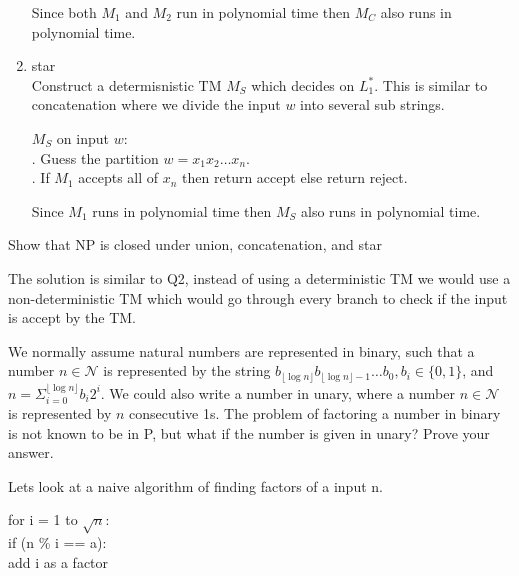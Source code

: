 \documentclass[12pt]{exam}
\begin{document}
\begin{questions}
\begin{solution}
\begin{enumerate}
            Since both $M_{1}$ and $M_{2}$ run in polynomial time then $M_{C}$ also runs in polynomial time.


      \item star\\
            Construct a determisnistic TM $M_{S}$ which decides on $L_{1}^{*}$. This is similar to concatenation where we divide the input $w$ into several sub strings.

            $M_{S}$ on input $w$:\\
            \null {}. Guess the partition $w = x_{1}x_{2}\dots x_{n}$.\\
            \null {}. If $M_{1}$ accepts all of $x_{n}$ then return accept else return reject.

            Since $M_{1}$ runs in polynomial time then $M_{S}$ also runs in polynomial time.

    \end{enumerate}

  \end{solution}

  \question{} %

  Show that NP is closed under union, concatenation, and star

  \begin{solution}
    The solution is similar to Q2, instead of using a deterministic TM we would use a non-deterministic TM which would go through every branch to check if the input is accept by the TM.
  \end{solution}

  \question{} %

  We normally assume natural numbers are represented in binary, such that a number $n\in \mathcal{N}$ is represented by the string $b_{\lfloor\log n \rfloor}b_{\lfloor \log n \rfloor - 1} \dots b_{0}, b_{i} \in \{0,1\}$, and $n=\Sigma^{\lfloor \log n \rfloor}_{i=0}b_{i}2^{i}$.
  We could also write a number in unary, where a number $n\in \mathcal{N}$ is represented by $n$ consecutive 1s.
  The problem of factoring a number in binary is not known to be in P, but what if the number is given in unary?
  Prove your answer.

  \begin{solution}

    Lets look at a naive algorithm of finding factors of a input n.

    for i = 1 to $\sqrt n$:\\
    \null \quad if (n \% i == a):\\
    \null \quad \quad add i as a factor


\end{solution}
\end{questions}
\end{document}
